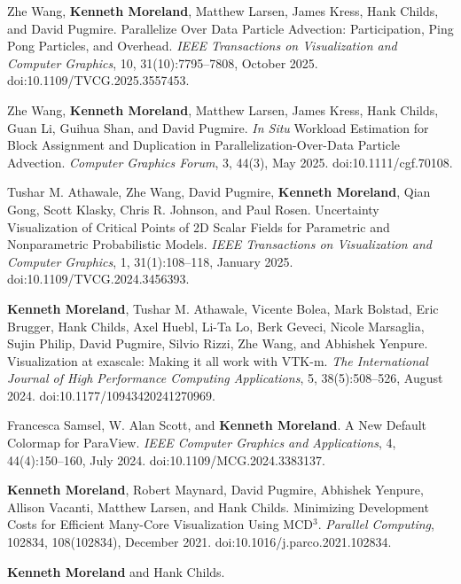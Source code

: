 \begin{enumerate}[label={[\arabic*]}, left=0pt]
\item  %
  Zhe Wang, \textbf{Kenneth Moreland}, Matthew Larsen, James Kress, Hank Childs, and David Pugmire.
  Parallelize Over Data Particle Advection: Participation, Ping Pong Particles, and Overhead.
  \emph{IEEE Transactions on Visualization and Computer Graphics}, 10, 31(10):7795--7808, October 2025.
  doi:10.1109/TVCG.2025.3557453.
\item  %
  Zhe Wang, \textbf{Kenneth Moreland}, Matthew Larsen, James Kress, Hank Childs, Guan Li, Guihua Shan, and David Pugmire.
  {\it In Situ} Workload Estimation for Block Assignment and Duplication in Parallelization-Over-Data Particle Advection.
  \emph{Computer Graphics Forum}, 3, 44(3), May 2025.
  doi:10.1111/cgf.70108.
\item  %
  Tushar M. Athawale, Zhe Wang, David Pugmire, \textbf{Kenneth Moreland}, Qian Gong, Scott Klasky, Chris R. Johnson, and Paul Rosen.
  Uncertainty Visualization of Critical Points of {2D} Scalar Fields for Parametric and Nonparametric Probabilistic Models.
  \emph{IEEE Transactions on Visualization and Computer Graphics}, 1, 31(1):108--118, January 2025.
  doi:10.1109/TVCG.2024.3456393.
\item  %
  \textbf{Kenneth Moreland}, Tushar M. Athawale, Vicente Bolea, Mark Bolstad, Eric Brugger, Hank Childs, Axel Huebl, Li-Ta Lo, Berk Geveci, Nicole Marsaglia, Sujin Philip, David Pugmire, Silvio Rizzi, Zhe Wang, and Abhishek Yenpure.
  {Visualization at exascale: Making it all work with VTK-m}.
  \emph{The International Journal of High Performance Computing Applications}, 5, 38(5):508--526, August 2024.
  doi:10.1177/10943420241270969.
\item  %
  Francesca Samsel, W. Alan Scott, and \textbf{Kenneth Moreland}.
  A New Default Colormap for {ParaView}.
  \emph{IEEE Computer Graphics and Applications}, 4, 44(4):150--160, July 2024.
  doi:10.1109/MCG.2024.3383137.
\item  %
  \textbf{Kenneth Moreland}, Robert Maynard, David Pugmire, Abhishek Yenpure, Allison Vacanti, Matthew Larsen, and Hank Childs.
  Minimizing Development Costs for Efficient Many-Core Visualization Using {MCD$^3$}.
  \emph{Parallel Computing}, 102834, 108(102834), December 2021.
  doi:10.1016/j.parco.2021.102834.
\item  %
  \textbf{Kenneth Moreland} and Hank Childs.

\end{enumerate}
